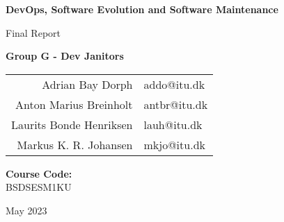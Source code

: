 \begin{titlepage}
    \begin{center}
       \vspace*{0.5cm}

        \huge
        \textbf{DevOps, Software Evolution and Software Maintenance}

        \vspace{0.5cm}
        \Large
        Final Report
            
        \vspace{1.5cm}

        \large
        \textbf{Group G - Dev Janitors} \\
        \vspace{0.25cm}
        \begin{tabular}{r l}
            Adrian Bay Dorph & addo@itu.dk        \\
            Anton Marius Breinholt & antbr@itu.dk        \\
            Laurits Bonde Henriksen & lauh@itu.dk \\
            Markus K. R. Johansen & mkjo@itu.dk   \\
        \end{tabular}

        \vspace{5cm}
        \large
        \textbf{Course Code:}\\
        BSDSESM1KU
        
        \vfill

        

        \vspace{0.8cm}
        May 2023
    \end{center}
\end{titlepage}